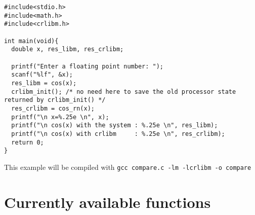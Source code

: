 \begin{lstlisting}[label={chap0:lst:prog_example},caption={compare.c},firstnumber=1]
#include<stdio.h>
#include<math.h>
#include<crlibm.h>

int main(void){
  double x, res_libm, res_crlibm;

  printf("Enter a floating point number: ");
  scanf("%lf", &x);
  res_libm = cos(x);
  crlibm_init(); /* no need here to save the old processor state returned by crlibm_init() */ 
  res_crlibm = cos_rn(x);
  printf("\n x=%.25e \n", x);
  printf("\n cos(x) with the system : %.25e \n", res_libm);
  printf("\n cos(x) with crlibm     : %.25e \n", res_crlibm);
  return 0;
}
\end{lstlisting}

This example will be compiled with \texttt{gcc compare.c -lm -lcrlibm -o compare}


\section{Currently available functions}

